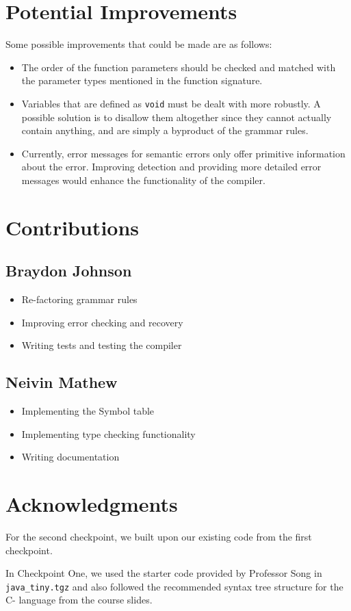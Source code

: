 \documentclass[12pt, letterpaper]{article}
\begin{document}
\section{Potential Improvements}
Some possible improvements that could be made are as follows:
\begin{itemize}
\item The order of the function parameters should be checked and matched with the parameter types mentioned in the function signature.
\item Variables that are defined as \texttt{void} must be dealt with more robustly. A possible solution is to disallow them altogether since they cannot actually contain anything, and are simply a byproduct of the grammar rules.
\item Currently, error messages for semantic errors only offer primitive information about the error. Improving detection and providing more detailed error messages would enhance the functionality of the compiler.
\end{itemize}

\clearpage
\section{Contributions}
\subsection{Braydon Johnson}
\begin{itemize}
\setlength\itemsep{0em}
\item Re-factoring grammar rules
\item Improving error checking and recovery
\item Writing tests and testing the compiler
\end{itemize}
\subsection{Neivin Mathew}
\begin{itemize}
\setlength\itemsep{0em}
\item Implementing the Symbol table
\item Implementing type checking functionality
\item Writing documentation
\end{itemize}

\section{Acknowledgments}
For the second checkpoint, we built upon our existing code from the first checkpoint.

In Checkpoint One, we used the starter code provided by Professor Song in \texttt{java\_tiny.tgz} and also followed the recommended syntax tree structure for the C- language from the course slides.
\end{document}
